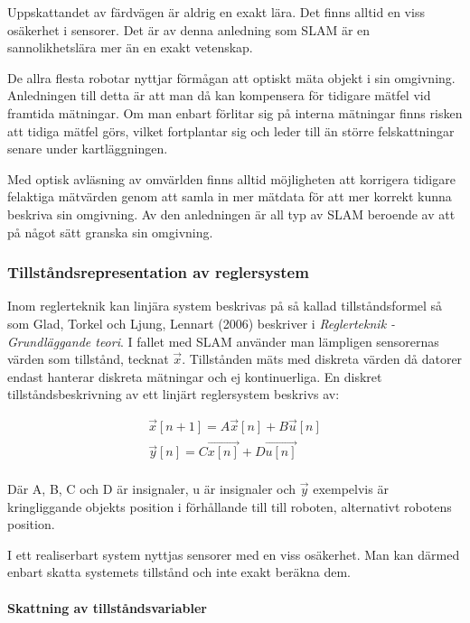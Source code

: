 \documentclass[a4paper,12pt,fleqn]{article}
\begin{document}
Uppskattandet av färdvägen är aldrig en exakt lära. Det finns alltid en viss osäkerhet i sensorer. Det är av denna anledning som SLAM är en sannolikhetslära mer än en exakt vetenskap. 

De allra flesta robotar nyttjar förmågan att optiskt mäta objekt i sin omgivning. Anledningen till detta är att man då kan kompensera för tidigare mätfel vid framtida mätningar. Om man enbart förlitar sig på interna mätningar finns risken att tidiga mätfel görs, vilket fortplantar sig och leder till än större felskattningar senare under kartläggningen. 

Med optisk avläsning av omvärlden finns alltid möjligheten att korrigera tidigare felaktiga mätvärden genom att samla in mer mätdata för att mer korrekt kunna beskriva sin omgivning. Av den anledningen är all typ av SLAM beroende av att på något sätt granska sin omgivning. 

\subsubsection{Tillståndsrepresentation av reglersystem}

Inom reglerteknik kan linjära system beskrivas på så kallad tillståndsformel så som Glad, Torkel och Ljung, Lennart (2006) beskriver i \textit{Reglerteknik - Grundläggande teori}. I fallet med SLAM använder man lämpligen sensorernas värden som tillstånd, tecknat $\vec{x}$. Tillstånden mäts med diskreta värden då datorer endast hanterar diskreta mätningar och ej kontinuerliga. En diskret tillståndsbeskrivning av ett linjärt reglersystem beskrivs av: 

\begin{gather}
\vec{x}[n+1] = A\vec{x}[n] + B\vec{u}[n] \\
\vec{y}[n] = C\vec{x[n]} + D\vec{u[n]}
\end{gather}
\\
Där A, B, C och D är insignaler, u är insignaler och $\vec{y}$ exempelvis är kringliggande objekts position i förhållande till till roboten, alternativt robotens position. 

I ett realiserbart system nyttjas sensorer med en viss osäkerhet. Man kan därmed enbart skatta systemets tillstånd och inte exakt beräkna dem. 

\paragraph{Skattning av tillståndsvariabler}
\end{document}
